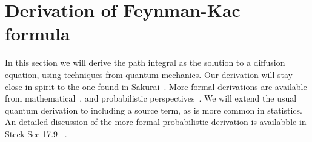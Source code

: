 \section{Derivation of Feynman-Kac formula }

In this section we will derive the path integral as the solution to a diffusion equation,
using techniques from quantum mechanics.  Our derivation will stay close in spirit to the 
one found in Sakurai~\cite{Sakurai1994}.  More formal derivations are available from mathematical~\cite{Cartier2004},
and probabilistic perspectives~\cite{Karatzas1991, Durrett1996}.  We will extend the usual quantum derivation to
including a source term, as is more common in statistics.   
An detailed discussion of the more formal probabilistic derivation is availabble in Steck Sec 17.9~\cite{SteckNotes} .


